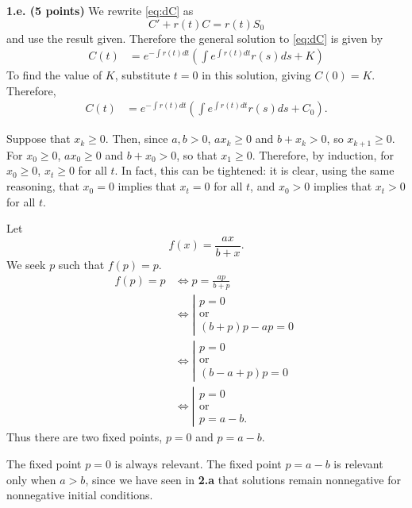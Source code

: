 \documentclass[12pt]{article}
\theoremstyle{plain}
\begin{document}
\vskip0.5cm
\noindent
{\bf 1.e. (5 points)}
We rewrite \eqref{eq:dC} as
\[
C'+r(t)C=r(t)S_0
\]
and use the result given. Therefore the general solution to \eqref{eq:dC} is given by
\begin{align*}
C(t) &= e^{-\int r(t)dt}\left(\int e^{\int r(t)dt}r(s)ds+K\right)
\end{align*}
To find the value of $K$, substitute $t=0$ in this solution, giving $C(0)=K$. Therefore,
\begin{align*}
C(t) &= e^{-\int r(t)dt}\left(\int e^{\int r(t)dt}r(s)ds+C_0\right).
\end{align*}


\vskip1cm
Suppose that $x_k\geq 0$. Then, since $a,b>0$, $ax_k\geq 0$ and $b+x_k>0$, so $x_{k+1}\geq 0$. For $x_0\geq 0$, $ax_0\geq 0$ and $b+x_0>0$, so that $x_1\geq 0$. Therefore, by induction, for $x_0\geq 0$, $x_t\geq 0$ for all $t$.
In fact, this can be tightened: it is clear, using the same reasoning, that $x_0=0$ implies that $x_t=0$ for all $t$, and $x_0>0$ implies that $x_t>0$ for all $t$.

\vskip0.5cm
Let
\[
f(x)=\frac{ax}{b+x}.
\]
We seek $p$ such that $f(p)=p$. 
\begin{align*}
f(p)=p &\Leftrightarrow p=\frac{ap}{b+p} \\
&\Leftrightarrow
\left|
\begin{array}{l}
p=0\\
\textrm{or}\\
(b+p)p-ap=0
\end{array}
\right. \\
&\Leftrightarrow
\left|
\begin{array}{l}
p=0\\
\textrm{or}\\
(b-a+p)p=0
\end{array}
\right. \\
&\Leftrightarrow
\left|
\begin{array}{l}
p=0\\
\textrm{or}\\
p=a-b.
\end{array}
\right.
\end{align*}
Thus there are two fixed points, $p=0$ and $p=a-b$. 

\vskip0.5cm
The fixed point $p=0$ is always relevant. The fixed point $p=a-b$ is relevant only when $a>b$, since we have seen in {\bf 2.a} that solutions remain nonnegative for nonnegative initial conditions.
\end{document}
